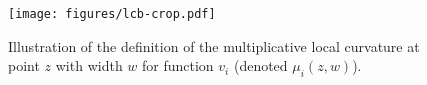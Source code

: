 \begin{figure}
\centering
\texttt{[image: figures/lcb-crop.pdf]}
\caption{{\small Illustration of the definition of the multiplicative local curvature at point $z$ with width $w$ for function $v_i$ (denoted $\mu_{i}(z,w)$).}}
\label{fig:lcb}
\end{figure}




